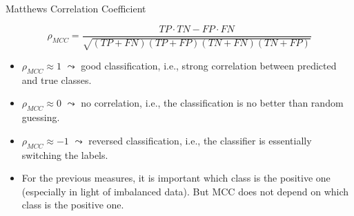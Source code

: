 \documentclass[11pt,compress,t,notes=noshow, xcolor=table]{beamer}
\begin{document}
\begin{vbframe}{Matthews Correlation Coefficient}
    \footnotesize{
        $$   \rho_{MCC} = \frac{TP\cdot TN - FP \cdot FN}{\sqrt{(TP+FN)(TP+FP)(TN+FN)(TN+FP)}}$$

        \begin{itemize}
            \item $\rho_{MCC} \approx 1$ $\leadsto$ good classification, i.e., strong correlation between predicted and true classes.
            \vspace{10pt}
    	
            \item $\rho_{MCC} \approx 0$ $\leadsto$ no correlation, i.e., the classification is no better than random guessing.
            \vspace{10pt}
    	
            \item $\rho_{MCC} \approx -1$ $\leadsto$ reversed classification, i.e., the classifier is essentially switching the labels.
            \vspace{10pt}
    
            \item For the previous measures, it is important which class is the positive one (especially in light of imbalanced data). But MCC does not depend on which class is the positive one.
            
        \end{itemize}
         
    }
    
\end{vbframe}
\end{document}
